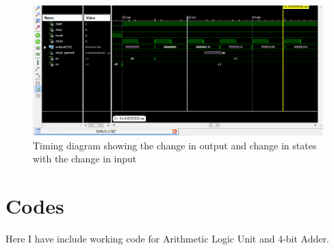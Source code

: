 \documentclass[12pt]{article}
\begin{document}
\begin{figure}
\centering
\includegraphics[width=1\textwidth]{Capture2}
\caption{Timing diagram showing the change in output and change in states with the change in input}
\label{fig3}
\end{figure}

\section{Codes}
Here I have include working code for Arithmetic Logic Unit and 4-bit Adder.
\end{document}
